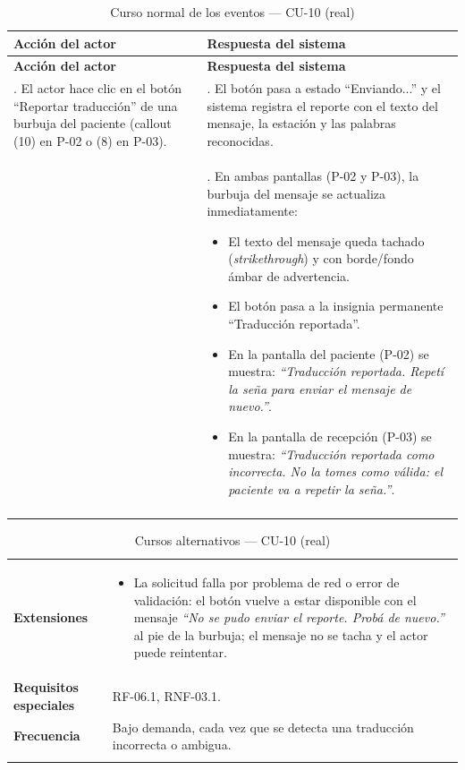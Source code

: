 \setlength{\extrarowheight}{5pt}
\begin{longtable}{@{}>{\raggedright\arraybackslash}p{} >{\raggedright\arraybackslash}p{}@{}}
\toprule
\textbf{Acción del actor} & \textbf{Respuesta del sistema} \\
\midrule
\endfirsthead
\toprule
\textbf{Acción del actor} & \textbf{Respuesta del sistema} \\
\midrule
\endhead
1. El actor hace clic en el botón ``Reportar traducción'' de una burbuja
del paciente (callout (10) en P-02 o (8) en P-03). &
2. El botón pasa a estado ``Enviando...'' y el sistema registra el
reporte con el texto del mensaje, la estación y las palabras reconocidas. \\
&
3. En ambas pantallas (P-02 y P-03), la burbuja del mensaje se actualiza
inmediatamente:
\begin{itemize}[leftmargin=*, itemsep=2pt]
    \item El texto del mensaje queda tachado (\textit{strikethrough}) y con
    borde/fondo ámbar de advertencia.
    \item El botón pasa a la insignia permanente ``Traducción reportada''.
    \item En la pantalla del paciente (P-02) se muestra: \textit{``Traducción
    reportada. Repetí la seña para enviar el mensaje de nuevo.''}.
    \item En la pantalla de recepción (P-03) se muestra: \textit{``Traducción
    reportada como incorrecta. No la tomes como válida: el paciente va a
    repetir la seña.''}.
\end{itemize} \\
\bottomrule
\caption{Curso normal de los eventos --- CU-10 (real)}
\end{longtable}
\setlength{\extrarowheight}{0pt}

\begin{longtable}{@{}p{4.1cm} >{\raggedright\arraybackslash}p{11.2cm}@{}}
\toprule
\textbf{Extensiones} &
\begin{itemize}[leftmargin=*, itemsep=2pt]
    \item[2a.] La solicitud falla por problema de red o error de validación:
    el botón vuelve a estar disponible con el mensaje \textit{``No se pudo
    enviar el reporte. Probá de nuevo.''} al pie de la burbuja; el mensaje
    no se tacha y el actor puede reintentar.
\end{itemize} \\
\textbf{Requisitos especiales} & RF-06.1, RNF-03.1. \\
\textbf{Frecuencia} &
Bajo demanda, cada vez que se detecta una traducción incorrecta o
ambigua. \\
\bottomrule
\caption{Cursos alternativos --- CU-10 (real)}
\end{longtable}

